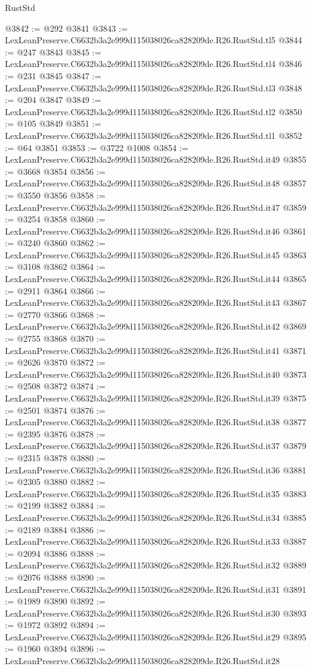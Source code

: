 \begin{lexlean}{RustStd}
\begin{coremodule}
@3842 := @292 @3841
@3843 := LexLeanPreserve.C6632b3a2e999d115038026ca828209de.R26.RustStd.tl5
@3844 := @247 @3843
@3845 := LexLeanPreserve.C6632b3a2e999d115038026ca828209de.R26.RustStd.tl4
@3846 := @231 @3845
@3847 := LexLeanPreserve.C6632b3a2e999d115038026ca828209de.R26.RustStd.tl3
@3848 := @204 @3847
@3849 := LexLeanPreserve.C6632b3a2e999d115038026ca828209de.R26.RustStd.tl2
@3850 := @105 @3849
@3851 := LexLeanPreserve.C6632b3a2e999d115038026ca828209de.R26.RustStd.tl1
@3852 := @64 @3851
@3853 := @3722 @1008
@3854 := LexLeanPreserve.C6632b3a2e999d115038026ca828209de.R26.RustStd.it49
@3855 := @3668 @3854
@3856 := LexLeanPreserve.C6632b3a2e999d115038026ca828209de.R26.RustStd.it48
@3857 := @3550 @3856
@3858 := LexLeanPreserve.C6632b3a2e999d115038026ca828209de.R26.RustStd.it47
@3859 := @3254 @3858
@3860 := LexLeanPreserve.C6632b3a2e999d115038026ca828209de.R26.RustStd.it46
@3861 := @3240 @3860
@3862 := LexLeanPreserve.C6632b3a2e999d115038026ca828209de.R26.RustStd.it45
@3863 := @3108 @3862
@3864 := LexLeanPreserve.C6632b3a2e999d115038026ca828209de.R26.RustStd.it44
@3865 := @2911 @3864
@3866 := LexLeanPreserve.C6632b3a2e999d115038026ca828209de.R26.RustStd.it43
@3867 := @2770 @3866
@3868 := LexLeanPreserve.C6632b3a2e999d115038026ca828209de.R26.RustStd.it42
@3869 := @2755 @3868
@3870 := LexLeanPreserve.C6632b3a2e999d115038026ca828209de.R26.RustStd.it41
@3871 := @2626 @3870
@3872 := LexLeanPreserve.C6632b3a2e999d115038026ca828209de.R26.RustStd.it40
@3873 := @2508 @3872
@3874 := LexLeanPreserve.C6632b3a2e999d115038026ca828209de.R26.RustStd.it39
@3875 := @2501 @3874
@3876 := LexLeanPreserve.C6632b3a2e999d115038026ca828209de.R26.RustStd.it38
@3877 := @2395 @3876
@3878 := LexLeanPreserve.C6632b3a2e999d115038026ca828209de.R26.RustStd.it37
@3879 := @2315 @3878
@3880 := LexLeanPreserve.C6632b3a2e999d115038026ca828209de.R26.RustStd.it36
@3881 := @2305 @3880
@3882 := LexLeanPreserve.C6632b3a2e999d115038026ca828209de.R26.RustStd.it35
@3883 := @2199 @3882
@3884 := LexLeanPreserve.C6632b3a2e999d115038026ca828209de.R26.RustStd.it34
@3885 := @2189 @3884
@3886 := LexLeanPreserve.C6632b3a2e999d115038026ca828209de.R26.RustStd.it33
@3887 := @2094 @3886
@3888 := LexLeanPreserve.C6632b3a2e999d115038026ca828209de.R26.RustStd.it32
@3889 := @2076 @3888
@3890 := LexLeanPreserve.C6632b3a2e999d115038026ca828209de.R26.RustStd.it31
@3891 := @1989 @3890
@3892 := LexLeanPreserve.C6632b3a2e999d115038026ca828209de.R26.RustStd.it30
@3893 := @1972 @3892
@3894 := LexLeanPreserve.C6632b3a2e999d115038026ca828209de.R26.RustStd.it29
@3895 := @1960 @3894
@3896 := LexLeanPreserve.C6632b3a2e999d115038026ca828209de.R26.RustStd.it28

\end{coremodule}
\end{lexlean}
